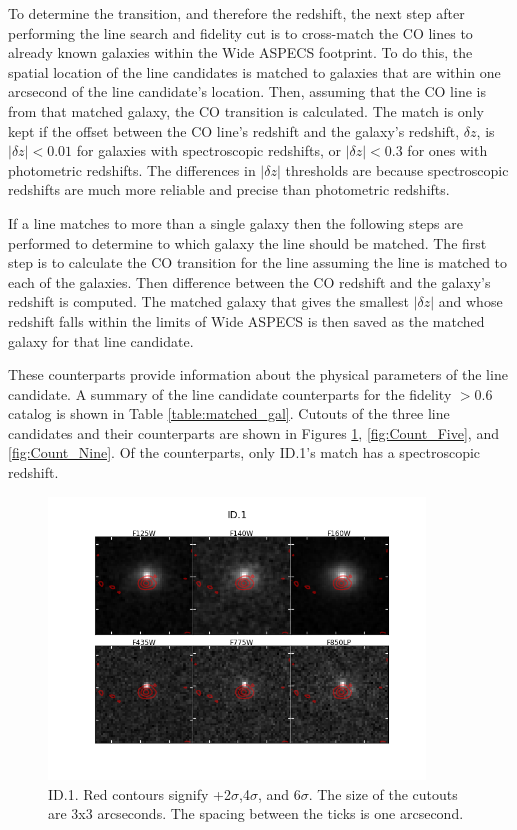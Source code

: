 To determine the transition, and therefore the redshift, the next step after performing the line search and fidelity cut is to cross-match the CO lines to already known galaxies within the Wide ASPECS footprint. To do this, the spatial location of the line candidates is matched to galaxies that are within one arcsecond of the line candidate's location. Then, assuming that the CO line is from that matched galaxy, the CO transition is calculated. The match is only kept if the offset between the CO line's redshift and the galaxy's redshift, $\delta z$, is $|\delta z| < 0.01$ for galaxies with spectroscopic redshifts, or $|\delta z| < 0.3$ for ones with photometric redshifts. The differences in $|\delta z|$ thresholds are because spectroscopic redshifts are much more reliable and precise than photometric redshifts. 

If a line matches to more than a single galaxy then the following steps are performed to determine to which galaxy the line should be matched. The first step is to calculate the CO transition for the line assuming the line is matched to each of the galaxies. Then difference between the CO redshift and the galaxy's redshift is computed. The matched galaxy that gives the smallest $|\delta z|$ and whose redshift falls within the limits of Wide ASPECS is then saved as the matched galaxy for that line candidate. 

These counterparts provide information about the physical parameters of the line candidate. A summary of the line candidate counterparts for the fidelity $>$0.6 catalog is shown in Table \ref{table:matched_gal}. Cutouts of the three line candidates and their counterparts are shown in Figures \ref{fig:Count_One}, \ref{fig:Count_Five}, and \ref{fig:Count_Nine}. Of the counterparts, only ID.1's match has a spectroscopic redshift.

\begin{figure}[!htbp]
\centering \includegraphics[width=100mm]{Matched/ASPECS_Cutout_0.png}
\caption{ID.1. Red contours signify +2$\sigma$,4$\sigma$, and 6$\sigma$. The size of the cutouts are 3x3 arcseconds. The spacing between the ticks is one arcsecond.}
\label{fig:Count_One}
\end{figure}

